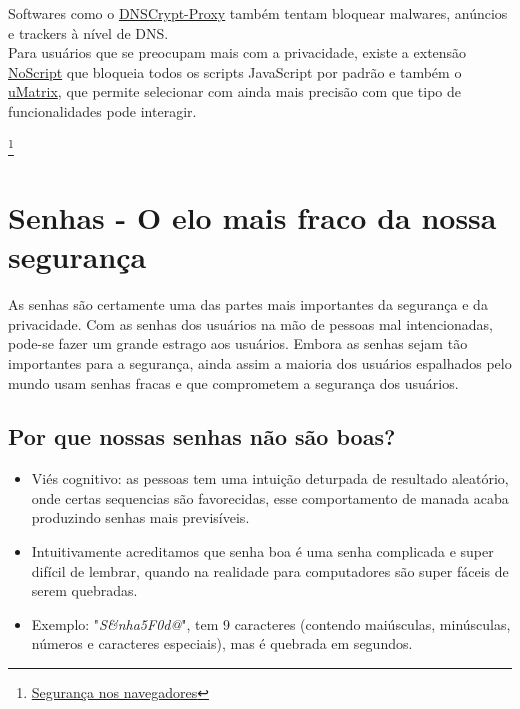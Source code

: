 \documentclass[12pt, letterpaper, DejaVuSansMono:12]{report}
\begin{document}
	Softwares como o \href{https://linuxroot.noblogs.org/post/2017/07/06/instalando-e-usando-o-dnscrypt-proxy/}{DNSCrypt-Proxy} também tentam bloquear malwares, anúncios e trackers à nível de DNS.\\

	Para usuários que se preocupam mais com a privacidade, existe a extensão \href{https://noscript.net}{NoScript} que bloqueia todos os scripts JavaScript por padrão e também o \href{https://addons.mozilla.org/en-US/firefox/addon/umatrix/}{uMatrix}, que permite selecionar com ainda mais precisão com que tipo de funcionalidades pode interagir.

\footnote{\href{https://linuxroot.noblogs.org/post/2017/07/13/seguranca-nos-navegadores/}{Segurança nos navegadores}}

\pagebreak

\section{Senhas - O elo mais fraco da nossa segurança}

As senhas são certamente uma das partes mais importantes da segurança e da privacidade. Com as senhas dos usuários na mão de pessoas mal intencionadas, pode-se fazer um grande estrago aos usuários. Embora as senhas sejam tão importantes para a segurança, ainda assim a maioria dos usuários espalhados pelo mundo usam senhas fracas e que comprometem a segurança dos usuários.\\

\subsection{Por que nossas senhas não são boas?}

\begin{itemize}
	\item Viés cognitivo: as pessoas tem uma intuição deturpada de resultado aleatório, onde certas sequencias são favorecidas, esse comportamento de manada acaba produzindo senhas mais previsíveis.
	\item Intuitivamente acreditamos que senha boa é uma senha complicada e super difícil de lembrar, quando na realidade para computadores são super fáceis de serem quebradas.
	\item Exemplo: "\textit{S\&nha5F0d@}", tem 9 caracteres (contendo maiúsculas, minúsculas, números e caracteres especiais), mas é quebrada em segundos.
\end{itemize}
\end{document}
